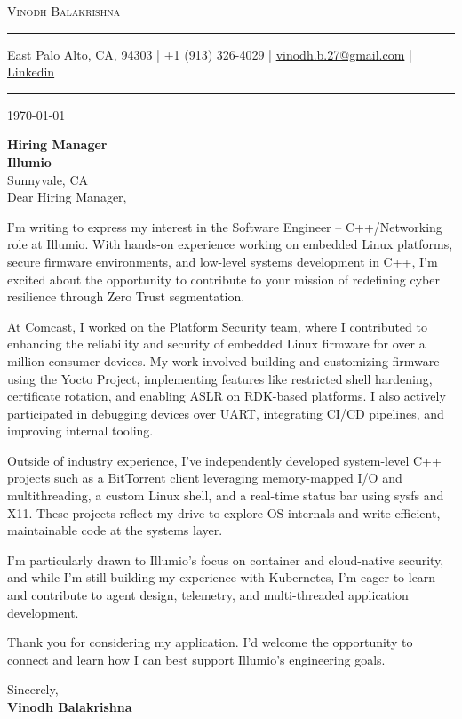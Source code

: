 \documentclass[11pt]{letter}
\renewcommand{\maketitle}[5] {
	{\scshape{\Huge {#1}}} \\
	\hrule
	{#2} | {#3} | \href{mailto:#4}{#4} | \href{https://#5}{Linkedin}
	\vspace*{0.25em}
	\hrule
}
\newcommand{\tocompany}[3] {
	\textbf{#1} \\
	\textbf{#2} \\
	{#3} \\
}
\begin{document}
\maketitle
{Vinodh Balakrishna}
{East Palo Alto, CA, 94303}
{+1 (913) 326-4029}
{vinodh.b.27@gmail.com}
{www.linkedin.com/in/vinodh27}

\vspace{1em}

\today

\vspace{1em}

\tocompany
{Hiring Manager}
{Illumio}
{Sunnyvale, CA}

Dear Hiring Manager,

\bigskip

I'm writing to express my interest in the Software Engineer – C++/Networking role at Illumio. With hands-on experience working on embedded Linux platforms, secure firmware environments, and low-level systems development in C++, I’m excited about the opportunity to contribute to your mission of redefining cyber resilience through Zero Trust segmentation.

\vspace{0.5em}
At Comcast, I worked on the Platform Security team, where I contributed to enhancing the reliability and security of embedded Linux firmware for over a million consumer devices. My work involved building and customizing firmware using the Yocto Project, implementing features like restricted shell hardening, certificate rotation, and enabling ASLR on RDK-based platforms. I also actively participated in debugging devices over UART, integrating CI/CD pipelines, and improving internal tooling.

\vspace{0.5em}
Outside of industry experience, I’ve independently developed system-level C++ projects such as a \mbox{BitTorrent} client leveraging memory-mapped I/O and multithreading, a custom Linux shell, and a real-time status bar using sysfs and X11. These projects reflect my drive to explore OS internals and write efficient, maintainable code at the systems layer.

\vspace{0.5em}
I’m particularly drawn to Illumio's focus on container and cloud-native security, and while I’m still building my experience with Kubernetes, I’m eager to learn and contribute to agent design, telemetry, and multi-threaded application development.

\vspace{0.5em}
Thank you for considering my application. I’d welcome the opportunity to connect and learn how I can best support Illumio’s engineering goals.

\bigskip

\vfill

Sincerely, \\
\textbf{Vinodh Balakrishna}
\end{document}
